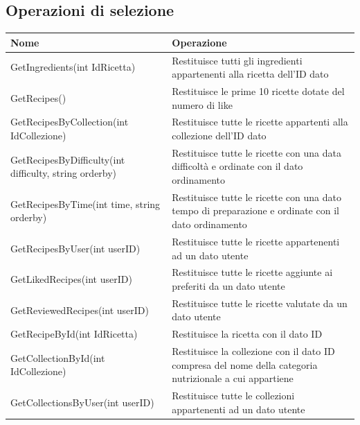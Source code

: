 ﻿\documentclass[a4paper,12pt]{report}
\begin{document}
\subsection{Operazioni di selezione}
\begin{table}[h!]
    \centering
    \begin{tabular}{ |p{3in}|p{2in}| }
        \hline
        \scriptsize{\textbf{Nome}} & \scriptsize{\textbf{Operazione}} \\
        \hline
        \scriptsize{GetIngredients(int IdRicetta)} & \scriptsize{Restituisce tutti gli ingredienti appartenenti alla ricetta dell'ID dato} \\
        \hline
        \scriptsize{GetRecipes()} & \scriptsize{Restituisce le prime 10 ricette dotate del numero di like} \\
        \hline
        \scriptsize{GetRecipesByCollection(int IdCollezione)} & \scriptsize{Restituisce tutte le ricette appartenti alla collezione dell'ID dato} \\
        \hline
        \scriptsize{GetRecipesByDifficulty(int difficulty, string orderby)} & \scriptsize{Restituisce tutte le ricette con una data difficoltà e ordinate con il dato ordinamento} \\
        \hline
        \scriptsize{GetRecipesByTime(int time, string orderby)} & \scriptsize{Restituisce tutte le ricette con una dato tempo di preparazione e ordinate con il dato ordinamento} \\
        \hline
        \scriptsize{GetRecipesByUser(int userID)} & \scriptsize{Restituisce tutte le ricette appartenenti ad un dato utente} \\
        \hline
        \scriptsize{GetLikedRecipes(int userID)} & \scriptsize{Restituisce tutte le ricette aggiunte ai preferiti da un dato utente} \\
        \hline
        \scriptsize{GetReviewedRecipes(int userID)} & \scriptsize{Restituisce tutte le ricette valutate da un dato utente} \\
        \hline
        \scriptsize{GetRecipeById(int IdRicetta)} & \scriptsize{Restituisce la ricetta con il dato ID} \\
        \hline
        \scriptsize{GetCollectionById(int IdCollezione)} & \scriptsize{Restituisce la collezione con il dato ID compresa del nome della categoria nutrizionale a cui appartiene} \\
        \hline
        \scriptsize{GetCollectionsByUser(int userID)} & \scriptsize{Restituisce tutte le collezioni appartenenti ad un dato utente} \\

\end{tabular}
\end{table}
\end{document}
